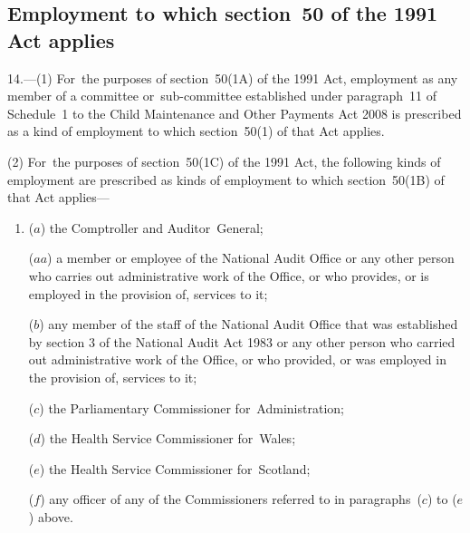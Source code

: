 \documentclass[12pt,a4paper]{article}
\begin{document}
\subsection[14. Employment to which section~50 of the 1991 Act applies]{Employment to which section~50 of the 1991 Act applies}

14.---(1)  For~the purposes of section~50(1A) of the 1991 Act, employment as any member of a committee or~sub-committee established under paragraph~11 of Schedule~1 to the Child Maintenance and Other Payments Act 2008 is prescribed as a kind of employment to which section~50(1) of that Act applies.

(2) For~the purposes of section~50(1C) of the 1991 Act, the following kinds of employment are prescribed as kinds of employment to which section~50(1B) of that Act applies—
\begin{enumerate}\item[]
($a$) the Comptroller and Auditor~General;

($aa$) a member or employee of the National Audit Office or any other person who carries out administrative work of the Office, or who provides, or is employed in the provision of, services to it;


($b$) any member of the staff of the National Audit Office that was established by section 3 of the National Audit Act 1983 or any other person who carried out administrative work of the Office, or who provided, or was employed in the provision of, services to it;

($c$) the Parliamentary Commissioner for~Administration;

($d$) the Health Service Commissioner for~Wales;

($e$) the Health Service Commissioner for~Scotland;

($f$) any officer of any of the Commissioners referred to in paragraphs~($c$)  to ($e$)    above.
\end{enumerate}

\end{document}
